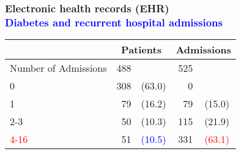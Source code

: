 \documentclass[11pt,pdftex,dvipsnames,usenames,helvetica]{beamer}
\begin{document}
\begin{frame}\frametitle{Electronic health records (EHR)\\
\textcolor{blue}{Diabetes and recurrent hospital admissions}}
\begin{center}
\begin{tabular}{lrcrc}\hline
&\multicolumn{2}{c}{Patients}&\multicolumn{2}{l}{Admissions}\\ \hline
Number of Admissions          &488&       & 525&\\
  0                 &308& (63.0)&   0& \\
  1                 & 79& (16.2)&  79& (15.0)\\
  2-3               & 50& (10.3)& 115& (21.9)\\
\textcolor{red}{4-16}              & 51& \textcolor{blue}{(10.5)}& 331& \textcolor{red}{(63.1)} \\ \hline
\end{tabular}
\end{center}
\end{frame}
\end{document}
